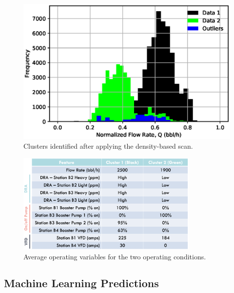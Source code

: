 \begin{figure}[h]
    \centering
    \includegraphics[scale=0.8]{images/suncor/08DBSCAN.eps}
    \caption{Clusters identified after applying the density-based scan.}
    \label{fig:02DBSCAN}
\end{figure}

\begin{figure}[h]
    \centering
    \includegraphics[width=0.8\textwidth]{images/suncor/08AvgChar.jpeg}
    \caption{Average operating variables for the two operating conditions.}
    \label{fig:02DBSCANV}
\end{figure}

\subsection{Machine Learning Predictions}

